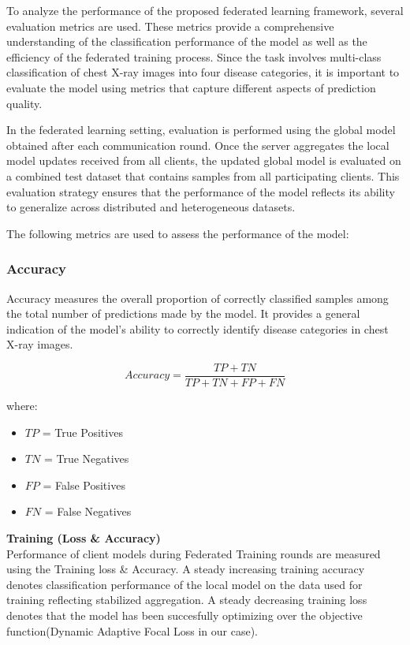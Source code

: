 \documentclass[12pt]{book}
\begin{document}
To analyze the performance of the proposed federated learning framework, several evaluation metrics are used. These metrics provide a comprehensive understanding of the classification performance of the model as well as the efficiency of the federated training process. Since the task involves multi-class classification of chest X-ray images into four disease categories, it is important to evaluate the model using metrics that capture different aspects of prediction quality.

In the federated learning setting, evaluation is performed using the global model obtained after each communication round. Once the server aggregates the local model updates received from all clients, the updated global model is evaluated on a combined test dataset that contains samples from all participating clients. This evaluation strategy ensures that the performance of the model reflects its ability to generalize across distributed and heterogeneous datasets.

The following metrics are used to assess the performance of the model:

\subsubsection{Accuracy}

Accuracy measures the overall proportion of correctly classified samples among the total number of predictions made by the model. It provides a general indication of the model's ability to correctly identify disease categories in chest X-ray images.

\begin{equation}
Accuracy = \frac{TP + TN}{TP + TN + FP + FN}
\end{equation}

where:
\begin{itemize}
\item $TP$ = True Positives
\item $TN$ = True Negatives
\item $FP$ = False Positives
\item $FN$ = False Negatives
\end{itemize}


\textbf{Training (Loss \& Accuracy)}\\
Performance of client models during Federated Training rounds are measured using the Training loss \& Accuracy. 
A steady increasing training accuracy denotes classification performance of the local model on the data used for training reflecting stabilized aggregation.
A steady decreasing training loss denotes that the model has been succesfully optimizing over the objective function(Dynamic Adaptive Focal Loss in our case).\\
\end{document}
